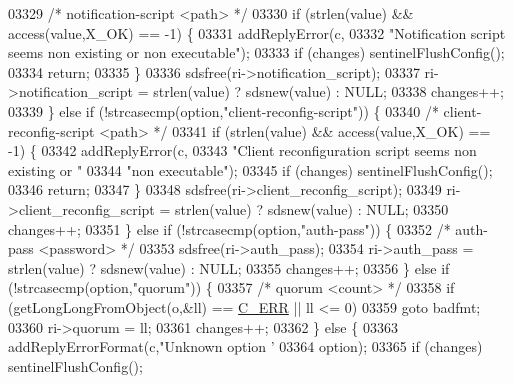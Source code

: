 \begin{DoxyCode}
{{{{{{{{{{{{{{{{{{{{{{{{{{{{{{{{{{{{{{{{{{{{{{{{{{{{{{{{{{{{{{{{{{{{{{{03329             \textcolor{comment}{/* notification-script <path> */}
03330             \textcolor{keywordflow}{if} (strlen(value) && access(value,X\_OK) == -1) \{
03331                 addReplyError(c,
03332                     \textcolor{stringliteral}{"Notification script seems non existing or non executable"});
03333                 \textcolor{keywordflow}{if} (changes) sentinelFlushConfig();
03334                 \textcolor{keywordflow}{return};
03335             \}
03336             sdsfree(ri->notification\_script);
03337             ri->notification\_script = strlen(value) ? sdsnew(value) : NULL;
03338             changes++;
03339        \} \textcolor{keywordflow}{else} \textcolor{keywordflow}{if} (!strcasecmp(option,\textcolor{stringliteral}{"client-reconfig-script"})) \{
03340             \textcolor{comment}{/* client-reconfig-script <path> */}
03341             \textcolor{keywordflow}{if} (strlen(value) && access(value,X\_OK) == -1) \{
03342                 addReplyError(c,
03343                     \textcolor{stringliteral}{"Client reconfiguration script seems non existing or "}
03344                     \textcolor{stringliteral}{"non executable"});
03345                 \textcolor{keywordflow}{if} (changes) sentinelFlushConfig();
03346                 \textcolor{keywordflow}{return};
03347             \}
03348             sdsfree(ri->client\_reconfig\_script);
03349             ri->client\_reconfig\_script = strlen(value) ? sdsnew(value) : NULL;
03350             changes++;
03351        \} \textcolor{keywordflow}{else} \textcolor{keywordflow}{if} (!strcasecmp(option,\textcolor{stringliteral}{"auth-pass"})) \{
03352             \textcolor{comment}{/* auth-pass <password> */}
03353             sdsfree(ri->auth\_pass);
03354             ri->auth\_pass = strlen(value) ? sdsnew(value) : NULL;
03355             changes++;
03356        \} \textcolor{keywordflow}{else} \textcolor{keywordflow}{if} (!strcasecmp(option,\textcolor{stringliteral}{"quorum"})) \{
03357             \textcolor{comment}{/* quorum <count> */}
03358             \textcolor{keywordflow}{if} (getLongLongFromObject(o,&ll) == \hyperlink{server_8h_af98ac28d5f4d23d7ed5985188e6fb7d1}{C\_ERR} || ll <= 0)
03359                 \textcolor{keywordflow}{goto} badfmt;
03360             ri->quorum = ll;
03361             changes++;
03362         \} \textcolor{keywordflow}{else} \{
03363             addReplyErrorFormat(c,\textcolor{stringliteral}{"Unknown option '%
03364                 option);
03365             \textcolor{keywordflow}{if} (changes) sentinelFlushConfig();
}}}}}}}}}}}}}}}}}}}}}}}}}}}}}}}}}}}}}}}}}}}}}}}}}}}}}}}}}}}}}}}}}}}}}}}}
\end{DoxyCode}
